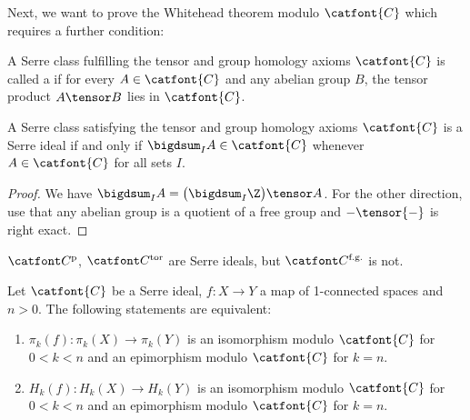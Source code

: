 Next, we want to prove the Whitehead theorem modulo $\catfont{C}$ which requires a further condition:
\begin{definition}
	A Serre class fulfilling the tensor and group homology axioms $\catfont{C}$ is called a  if for every $A \in \catfont{C}$ and any abelian group $B$, the tensor product $A \tensor B$ lies in $\catfont{C}$.
\end{definition}
\begin{lemma}
	A Serre class satisfying the tensor and group homology axioms $\catfont{C}$ is a Serre ideal if and only if $\bigdsum_I A \in \catfont{C}$ whenever $A \in \catfont{C}$ for all sets $I$.
\end{lemma}
\begin{proof}
	We have $\bigdsum_I A = \big(\bigdsum_I \Z\big) \tensor A$.
	For the other direction, use that any abelian group is a quotient of a free group and ${{-}} \tensor {{-}}$ is right exact.
\end{proof}
\begin{example}
	$\Cptor$, $\Ctor$ are Serre ideals, but $\Cfg$ is not.
\end{example}
\begin{theorem}
	Let $\catfont{C}$ be a Serre ideal, $f\colon X \to Y$ a map of 1-connected spaces and $n > 0$.
	The following statements are equivalent:
	\begin{enumerate}
		\item $\pi_k(f)\colon \pi_k(X) \to \pi_k(Y)$ is an isomorphism modulo $\catfont{C}$ for $0 < k < n$ and an epimorphism modulo $\catfont{C}$ for $k = n$.
		\item $H_k(f)\colon H_k(X) \to H_k(Y)$ is an isomorphism modulo $\catfont{C}$ for $0 < k < n$ and an epimorphism modulo $\catfont{C}$ for $k = n$.
	\end{enumerate}
\end{theorem}
